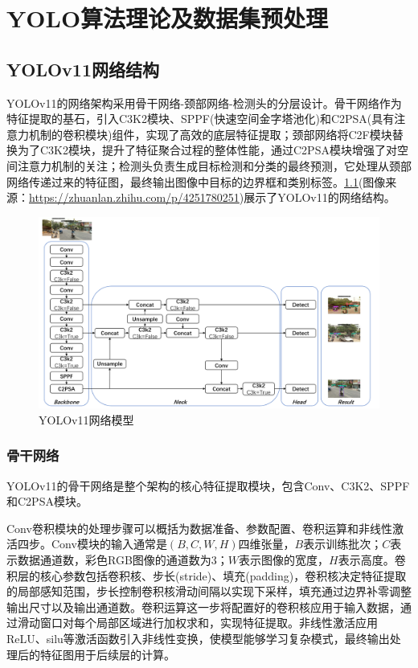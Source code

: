 
\chapter{YOLO算法理论及数据集预处理}

\section{YOLOv11网络结构}
YOLOv11的网络架构采用骨干网络-颈部网络-检测头的分层设计。骨干网络作为特征提取的基石，引入C3K2模块、SPPF(快速空间金字塔池化)和C2PSA(具有注意力机制的卷积模块)组件，实现了高效的底层特征提取；颈部网络将C2F模块替换为了C3K2模块，提升了特征聚合过程的整体性能，通过C2PSA模块增强了对空间注意力机制的关注；检测头负责生成目标检测和分类的最终预测，它处理从颈部网络传递过来的特征图，最终输出图像中目标的边界框和类别标签。\ref{fig:s}(图像来源：\url{https://zhuanlan.zhihu.com/p/4251780251})展示了YOLOv11的网络结构。
\begin{figure}[!htb]
  \centering
  \includegraphics[width=1\textwidth]{figs/chap02/yolov11.png}
  \caption{YOLOv11网络模型}
  \label{fig:s}
\end{figure}

\subsection{骨干网络}
YOLOv11的骨干网络是整个架构的核心特征提取模块，包含Conv、C3K2、SPPF和C2PSA模块。

Conv卷积模块的处理步骤可以概括为数据准备、参数配置、卷积运算和非线性激活四步。Conv模块的输入通常是$(B, C, W, H)$四维张量，$B$表示训练批次；$C$表示数据通道数，彩色RGB图像的通道数为3；$W$表示图像的宽度，$H$表示高度。卷积层的核心参数包括卷积核、步长(stride)、填充(padding)，卷积核决定特征提取的局部感知范围，步长控制卷积核滑动间隔以实现下采样，填充通过边界补零调整输出尺寸以及输出通道数。卷积运算这一步将配置好的卷积核应用于输入数据，通过滑动窗口对每个局部区域进行加权求和，实现特征提取。非线性激活应用ReLU、silu等激活函数引入非线性变换，使模型能够学习复杂模式，最终输出处理后的特征图用于后续层的计算。

